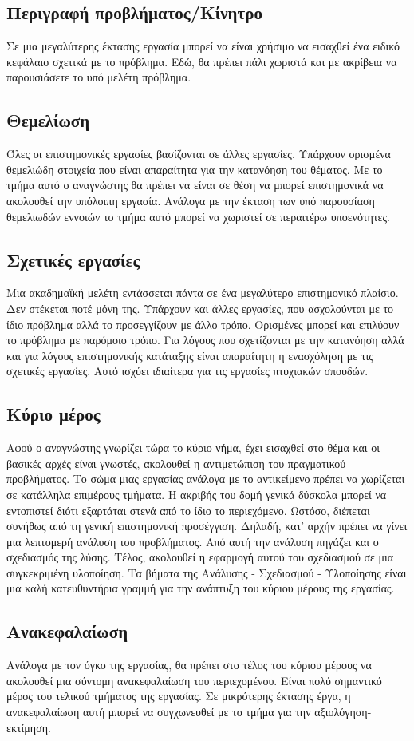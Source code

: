 \subsection{Περιγραφή προβλήματος/Κίνητρο}
Σε μια μεγαλύτερης έκτασης εργασία μπορεί να είναι χρήσιμο να εισαχθεί ένα ειδικό κεφάλαιο σχετικά με το πρόβλημα. Εδώ, θα πρέπει πάλι χωριστά και με ακρίβεια να παρουσιάσετε το υπό μελέτη πρόβλημα.
\subsection{Θεμελίωση}
Όλες οι επιστημονικές εργασίες βασίζονται σε άλλες εργασίες. Υπάρχουν ορισμένα θεμελιώδη στοιχεία που είναι απαραίτητα για την κατανόηση του θέματος. Με το τμήμα αυτό ο αναγνώστης θα πρέπει να είναι σε θέση να μπορεί επιστημονικά να ακολουθεί την υπόλοιπη εργασία. Ανάλογα με την έκταση των υπό παρουσίαση θεμελιωδών εννοιών το τμήμα αυτό μπορεί να χωριστεί σε περαιτέρω υποενότητες.
\subsection{Σχετικές εργασίες}
Μια ακαδημαϊκή μελέτη εντάσσεται πάντα σε ένα μεγαλύτερο επιστημονικό πλαίσιο. Δεν στέκεται ποτέ μόνη της. Υπάρχουν και άλλες εργασίες, που ασχολούνται με το ίδιο πρόβλημα αλλά το προσεγγίζουν με άλλο τρόπο. Ορισμένες μπορεί και επιλύουν το πρόβλημα με παρόμοιο τρόπο. Για λόγους που σχετίζονται με την κατανόηση αλλά και για λόγους επιστημονικής κατάταξης είναι απαραίτητη η ενασχόληση με τις σχετικές εργασίες. Αυτό ισχύει ιδιαίτερα για τις εργασίες πτυχιακών σπουδών.
\subsection{Κύριο μέρος}
Αφού ο αναγνώστης γνωρίζει τώρα το κύριο νήμα, έχει εισαχθεί στο θέμα και οι βασικές αρχές είναι γνωστές, ακολουθεί η αντιμετώπιση του πραγματικού προβλήματος. Το σώμα μιας εργασίας ανάλογα με το αντικείμενο πρέπει να χωρίζεται σε κατάλληλα επιμέρους τμήματα. Η ακριβής του δομή γενικά δύσκολα μπορεί να εντοπιστεί διότι εξαρτάται στενά από το ίδιο το περιεχόμενο. Ωστόσο, διέπεται συνήθως από τη γενική επιστημονική προσέγγιση. Δηλαδή, κατ' αρχήν πρέπει να γίνει μια λεπτομερή ανάλυση του προβλήματος. Από αυτή την ανάλυση πηγάζει και ο σχεδιασμός της λύσης. Τέλος, ακολουθεί η εφαρμογή αυτού του σχεδιασμού σε μια συγκεκριμένη υλοποίηση. Τα βήματα της Ανάλυσης - Σχεδιασμού - Υλοποίησης είναι μια καλή κατευθυντήρια γραμμή για την ανάπτυξη του κύριου μέρους της εργασίας.
\subsection{Ανακεφαλαίωση}
Ανάλογα με τον όγκο της εργασίας, θα πρέπει στο τέλος του κύριου μέρους να ακολουθεί μια σύντομη ανακεφαλαίωση του περιεχομένου. Είναι πολύ σημαντικό μέρος του τελικού τμήματος της εργασίας. Σε μικρότερης έκτασης έργα, η ανακεφαλαίωση αυτή μπορεί να συγχωνευθεί με το τμήμα για την αξιολόγηση-εκτίμηση.
